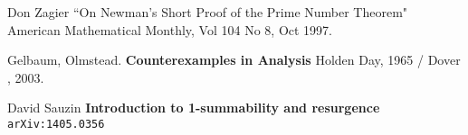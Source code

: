 \documentclass[12pt]{article}
\begin{document}
\begin{thebibliography}{}

\item Don Zagier ``On Newman's Short Proof of the Prime Number Theorem" American Mathematical Monthly, Vol 104 No 8, Oct 1997.

\item Gelbaum, Olmstead. \textbf{Counterexamples in Analysis} Holden Day, 1965 / Dover , 2003.

\item David Sauzin \textbf{Introduction to 1-summability and resurgence} \texttt{arXiv:1405.0356}

\end{thebibliography}
\end{document}
